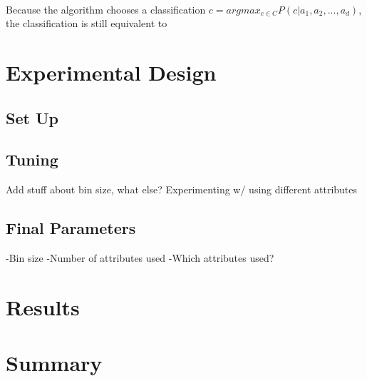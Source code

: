 \documentclass[twoside,11pt]{article}
\begin{document}
\paragraph{} Because the algorithm chooses a classification $c = argmax_{c \in C}P(c|a_1, a_2, ..., a_d)$, the classification is still equivalent to

\section{Experimental Design}

\subsection{Set Up}


\subsection{Tuning}

Add stuff about bin size, what else? \newline
Experimenting w/ using different attributes

\subsection{Final Parameters}

-Bin size \newline
-Number of attributes used \newline
-Which attributes used? \newline

\section{Results}

\section{Summary}


\end{document}
